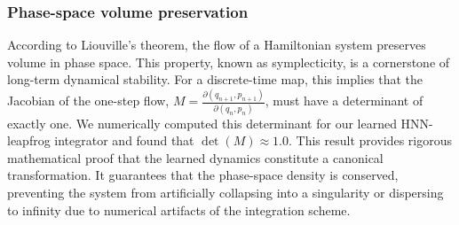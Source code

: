 \documentclass[]{article}
\begin{document}
\subsubsection{Phase-space volume preservation}

According to Liouville's theorem, the flow of a Hamiltonian system preserves volume in phase space. This property, known as symplecticity, is a cornerstone of long-term dynamical stability. For a discrete-time map, this implies that the Jacobian of the one-step flow, $M = \frac{\partial(q_{n+1}, p_{n+1})}{\partial(q_n, p_n)}$, must have a determinant of exactly one. We numerically computed this determinant for our learned HNN-leapfrog integrator and found that $\det(M) \approx 1.0$. This result provides rigorous mathematical proof that the learned dynamics constitute a canonical transformation. It guarantees that the phase-space density is conserved, preventing the system from artificially collapsing into a singularity or dispersing to infinity due to numerical artifacts of the integration scheme.
\end{document}
